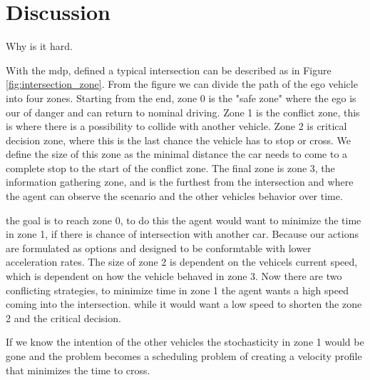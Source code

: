 \section{Discussion}
Why is it hard. 

With the \gls{mdp}, defined a typical intersection can be described as in Figure \ref{fig:intersection_zone}. From the figure we can divide the path of the ego vehicle into four zones. Starting from the end, zone 0 is the "safe zone" where the ego is our of danger and can return to nominal driving. Zone 1 is the conflict zone, this is where there is a possibility to collide with another vehicle. Zone 2 is critical decision zone, where this is the last chance the vehicle has to stop or cross. We define the size of this zone as the minimal distance the car needs to come to a complete stop to the start of the conflict zone. The final zone is zone 3, the information gathering zone, and is the furthest from the intersection and where the agent can observe the scenario and the other vehicles behavior over time. 

the goal is to reach zone 0, 
to do this the agent would want to minimize the time in zone 1, if there is chance of intersection with another car.
Because our actions are formulated as options and designed to be conformtable with lower acceleration rates. The size of zone 2 is dependent on the vehicels current speed, which is dependent on how the vehicle behaved in zone 3. 
Now there are two conflicting strategies, to minimize time in zone 1 the agent wants a high speed coming into the intersection. while it would want a low speed to shorten the zone 2 and the critical decision. 

If we know the intention of the other vehicles the stochasticity in zone 1 would be gone and the problem becomes a scheduling problem of creating a velocity profile that minimizes the time to cross.  

